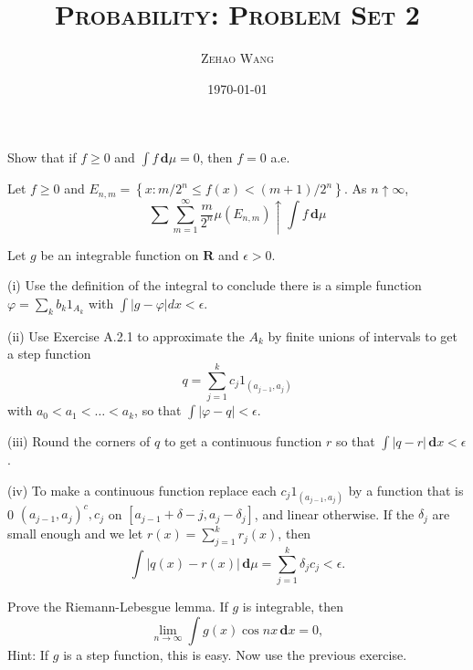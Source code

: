 \documentclass[en, normal, 11pt, black]{elegantnote}
\title{\textsc{Probability: Problem Set 2}}
\author{\textsc{Zehao Wang}}
\date{\today}
\newenvironment{exercise}[1]{\begin{tcolorbox}[colback=black!15, colframe=black!80, title=#1]}{\end{tcolorbox}}
\newcommand{\der}{\,\mathbf{d}}
\begin{document}
\maketitle
    \begin{exercise}{1.4.1.}
        Show that if \(f\geq 0\) and \(\int f\der \mu = 0\), then \(f=0\) a.e. 
    \end{exercise}

    \begin{exercise}{1.4.2.}
        Let \(f \geq 0\) and \(E_{n, m}=\left\{x: m / 2^{n} \leq f(x)<(m+1) / 2^{n}\right\} \). As \(n \uparrow \infty\), 
        \[\sum \sum_{m=1}^{\infty} \frac{m}{2^{n}} \mu\left(E_{n, m}\right) \uparrow \int f \der \mu\]
    \end{exercise}

    \begin{exercise}{1.4.3.}
        Let $g$ be an integrable function on $\mathbf{R}$ and $\epsilon>0$. 
        
        (i) Use the definition of the integral to conclude there is a simple function $\varphi=\sum_{k} b_{k} 1_{A_{k}}$ with $\int|g-\varphi| d x<\epsilon$. 
        
        (ii) Use Exercise A.2.1 to approximate the $A_{k}$ by finite unions of intervals to get a step function
        $$
        q=\sum_{j=1}^{k} c_{j} 1_{\left(a_{j-1}, a_{j}\right)}
        $$
        with $a_{0}<a_{1}<\ldots<a_{k}$, so that $\int|\varphi-q|<\epsilon$. 
        
        (iii) Round the corners of $q$ to get a continuous function $r$ so that $\int|q-r| \der x<\epsilon$. 

        (iv) To make a continuous function replace each $c_{j} 1_{\left(a_{j-1}, a_{j}\right)}$ by a function that is 0 $\left(a_{j-1}, a_{j}\right)^{c}, c_{j}$ on $\left[a_{j-1}+\delta-j, a_{j}-\delta_{j}\right]$, and linear otherwise. If the $\delta_{j}$ are small enough and we let $r(x)=\sum_{j=1}^{k} r_{j}(x)$, then
        $$
        \int|q(x)-r(x)| \der \mu=\sum_{j=1}^{k} \delta_{j} c_{j}<\epsilon. 
        $$
    \end{exercise}

    \begin{exercise}{1.4.4.}
        Prove the Riemann-Lebesgue lemma. If \(g\) is integrable, then
        $$
        \lim _{n \rightarrow \infty} \int g(x) \cos n x \der x=0, 
        $$
        Hint: If $g$ is a step function, this is easy. Now use the previous exercise.
    \end{exercise}
\end{document}

